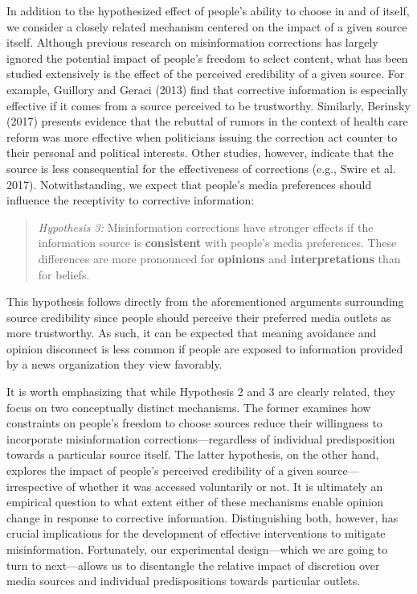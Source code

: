 \documentclass[
  12pt,
]{article}
\begin{document}
In addition to the hypothesized effect of people's ability to choose in
and of itself, we consider a closely related mechanism centered on the
impact of a given source itself. Although previous research on
misinformation corrections has largely ignored the potential impact of
people's freedom to select content, what has been studied extensively is
the effect of the perceived credibility of a given source. For example,
Guillory and Geraci (2013) find that corrective information is
especially effective if it comes from a source perceived to be
trustworthy. Similarly, Berinsky (2017) presents evidence that the
rebuttal of rumors in the context of health care reform was more
effective when politicians issuing the correction act counter to their
personal and political interests. Other studies, however, indicate that
the source is less consequential for the effectiveness of corrections
(e.g., Swire et al. 2017). Notwithstanding, we expect that people's
media preferences should influence the receptivity to corrective
information:

\singlespace

\begin{quote}
\emph{Hypothesis 3:} Misinformation corrections have stronger effects if
the information source is \textbf{consistent} with people's media
preferences. These differences are more pronounced for \textbf{opinions}
and \textbf{interpretations} than for beliefs.
\end{quote}

\vspace{1em}\doublespace

\noindent This hypothesis follows directly from the aforementioned
arguments surrounding source credibility since people should perceive
their preferred media outlets as more trustworthy. As such, it can be
expected that meaning avoidance and opinion disconnect is less common if
people are exposed to information provided by a news organization they
view favorably.

It is worth emphasizing that while Hypothesis 2 and 3 are clearly
related, they focus on two conceptually distinct mechanisms. The former
examines how constraints on people's freedom to choose sources reduce
their willingness to incorporate misinformation corrections---regardless
of individual predisposition towards a particular source itself. The
latter hypothesis, on the other hand, explores the impact of people's
perceived credibility of a given source---irrespective of whether it was
accessed voluntarily or not. It is ultimately an empirical question to
what extent either of these mechanisms enable opinion change in response
to corrective information. Distinguishing both, however, has crucial
implications for the development of effective interventions to mitigate
misinformation. Fortunately, our experimental design---which we are
going to turn to next---allows us to disentangle the relative impact of
discretion over media sources and individual predispositions towards
particular outlets.
\end{document}
